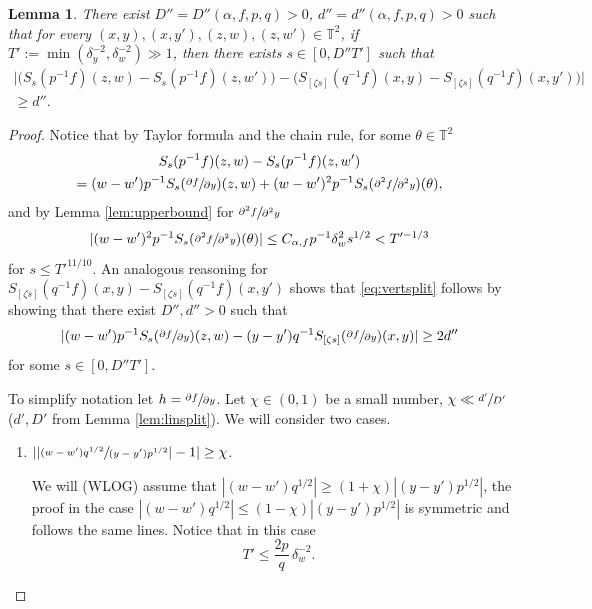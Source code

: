 \documentclass[JEP,XML,SOM,Unicode,NoEqCountersInSection]{cedram}
\newcounter{case}
\theoremstyle{definition}
\theoremstyle{plain}
\newtheorem{lemma}[definition]{Lemma}
\newcommand\TT{\mathbb{T}}
\begin{document}
\begin{lemma}\label{lem:vertsplit}
There exist $D''=D''(\alpha,f,p,q)>0$, $d''=d''(\alpha,f,p,q)>0$ such that for every
$(x,y),(x,y'),(z,w),(z,w')\in \TT^2$, if $T':=\min(\delta_y^{-2}, \delta_w^{-2})\gg 1$, then there exists $s\in[0,D''T']$ such that
\begin{multline}\label{eq:vertsplit}
\bigl|\bigl(S_{s}(p^{-1}f)(z,w)-S_{s}(p^{-1}f)(z,w')\bigr)-
\bigl(S_{[\zeta s]}(q^{-1}f)(x,y)-S_{[\zeta s]}(q^{-1}f)(x,y')\bigr)\bigr|\\
\geq d''.
\end{multline}
\end{lemma}
\begin{proof}
Notice that by Taylor formula and the chain rule, for some $\theta\in \TT^2$\vspace*{-5pt}
\begin{multline*}
S_s(p^{-1}f)(z,w)-S_s(p^{-1}f)(z,w') \\ =
(w-w')p^{-1}S_s(\sfrac{\partial f}{\partial y})(z,w) +
(w-w')^2p^{-1}S_s(\sfrac{\partial^2 f}{\partial^2 y})(\theta),
\end{multline*}
and by Lemma \ref{lem:upperbound} for $\sfrac{\partial^2 f}{\partial^2 y}$
\[
|(w-w')^2p^{-1}S_s(\sfrac{\partial^2 f}{\partial^2 y})(\theta)|\leq C_{\alpha,f} p^{-1}\delta_w^2s^{1/2}<T'^{-1/3}
\]
for $s\leq T'^{11/10}$. An analogous reasoning for $S_{[\zeta s]}(q^{-1}f)(x,y)-S_{[\zeta s]}(q^{-1}f)(x,y')$ shows that \eqref{eq:vertsplit} follows by showing that there exist $D'',d''>0$ such that
\begin{equation}\label{eq:ghj}
|(w-w')p^{-1}S_{s}(\sfrac{\partial f}{\partial y})(z,w)-(y-y')q^{-1}S_{[\zeta s]}(\sfrac{\partial f}{\partial y})(x,y)|\geq 2d''
\end{equation}
for some $s\in [0, D''T']$.

To simplify notation let $h=\sfrac{\partial f}{\partial y}$. Let $\chi \in (0,1)$ be a small number, $\chi\ll \sfrac{d'}{D'}$ ($d',D'$ from Lemma \ref{lem:linsplit}).
We will consider two cases.

\begin{enumerate}\renewcommand{\theenumi}{\textbf{\Alph{enumi}}}
\item\label{A}
$\left||\sfrac{(w-w')q^{1/2}}{(y-y')p^{1/2}}|-1\right|\geq \chi$.

We will (WLOG) assume that $|(w-w')q^{1/2}|\geq (1+\chi)|(y-y')p^{1/2}|$, the proof in the case $|(w-w')q^{1/2}|\leq (1-\chi)|(y-y')p^{1/2}|$ is symmetric and follows the same lines. Notice that in this case
\[ \quad T'\leq \frac{2p }{q }\,\delta_w^{-2}.\]


\end{enumerate}
\end{proof}
\end{document}
